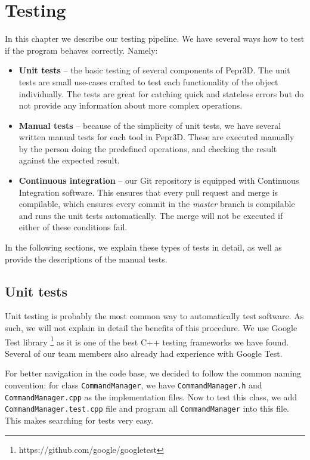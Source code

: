 \chapter{Testing}

In this chapter we describe our testing pipeline. We have several ways how to test if the program behaves correctly. Namely:

\begin{itemize}
\item \textbf{Unit tests} -- the basic testing of several components of Pepr3D. The unit tests are small use-cases crafted to test each functionality of the object individually. The tests are great for catching quick and stateless errors but do not provide any information about more complex operations.

\item \textbf{Manual tests} -- because of the simplicity of unit tests, we have several written manual tests for each tool in Pepr3D. These are executed manually by the person doing the predefined operations, and checking the result against the expected result.

\item \textbf{Continuous integration} -- our Git repository is equipped with Continuous Integration software. This ensures that every pull request and merge is compilable, which ensures every commit in the \textit{master} branch is compilable and runs the unit tests automatically. The merge will not be executed if either of these conditions fail.
\end{itemize}

In the following sections, we explain these types of tests in detail, as well as provide the descriptions of the manual tests.

\section{Unit tests}

Unit testing is probably the most common way to automatically test software. As such, we will not explain in detail the benefits of this procedure. We use Google Test library \footnote{https://github.com/google/googletest} as it is one of the best C++ testing frameworks we have found. Several of our team members also already had experience with Google Test.

For better navigation in the code base, we decided to follow the common naming convention: for class \texttt{CommandManager}, we have \texttt{CommandManager.h} and \texttt{CommandManager.cpp} as the implementation files. Now to test this class, we add \texttt{CommandManager.test.cpp} file and program all \texttt{CommandManager} into this file. This makes searching for tests very easy.

